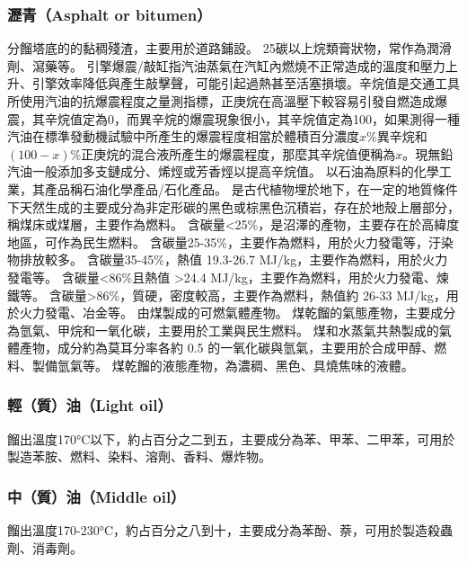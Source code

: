 \documentclass[a4paper,12pt]{report}
\begin{document}
\begin{itemize}
\subsubsection{瀝青（Asphalt or bitumen）}
分餾塔底的的黏稠殘渣，主要用於道路鋪設。
25碳以上烷類膏狀物，常作為潤滑劑、瀉藥等。
引擎爆震/敲缸指汽油蒸氣在汽缸內燃燒不正常造成的溫度和壓力上升、引擎效率降低與產生敲擊聲，可能引起過熱甚至活塞損壞。辛烷值是交通工具所使用汽油的抗爆震程度之量測指標，正庚烷在高溫壓下較容易引發自燃造成爆震，其辛烷值定為0，而異辛烷的爆震現象很小，其辛烷值定為100，如果測得一種汽油在標準發動機試驗中所產生的爆震程度相當於體積百分濃度$x$\%異辛烷和$(100-x)$\%正庚烷的混合液所產生的爆震程度，那麼其辛烷值便稱為$x$。現無鉛汽油一般添加多支鏈成分、烯烴或芳香烴以提高辛烷值。
以石油為原料的化學工業，其產品稱石油化學產品/石化產品。
是古代植物埋於地下，在一定的地質條件下天然生成的主要成分為非定形碳的黑色或棕黑色沉積岩，存在於地殼上層部分，稱煤床或煤層，主要作為燃料。
含碳量<25\%，是沼澤的產物，主要存在於高緯度地區，可作為民生燃料。
含碳量25-35\%，主要作為燃料，用於火力發電等，汙染物排放較多。
含碳量35-45\%，熱值 19.3-26.7 MJ/kg，主要作為燃料，用於火力發電等。
含碳量<86\%且熱值 >24.4 MJ/kg，主要作為燃料，用於火力發電、煉鐵等。
含碳量>86\%，質硬，密度較高，主要作為燃料，熱值約 26-33 MJ/kg，用於火力發電、冶金等。
由煤製成的可燃氣體產物。
煤乾餾的氣態產物，主要成分為氫氣、甲烷和一氧化碳，主要用於工業與民生燃料。
煤和水蒸氣共熱製成的氣體產物，成分約為莫耳分率各約 0.5 的一氧化碳與氫氣，主要用於合成甲醇、燃料、製備氫氣等。
煤乾餾的液態產物，為濃稠、黑色、具燒焦味的液體。
\subsubsection{輕（質）油（Light oil）}
餾出溫度170°C以下，約占百分之二到五，主要成分為苯、甲苯、二甲苯，可用於製造苯胺、燃料、染料、溶劑、香料、爆炸物。
\subsubsection{中（質）油（Middle oil）}
餾出溫度170-230°C，約占百分之八到十，主要成分為苯酚、萘，可用於製造殺蟲劑、消毒劑。

\end{itemize}
\end{document}
